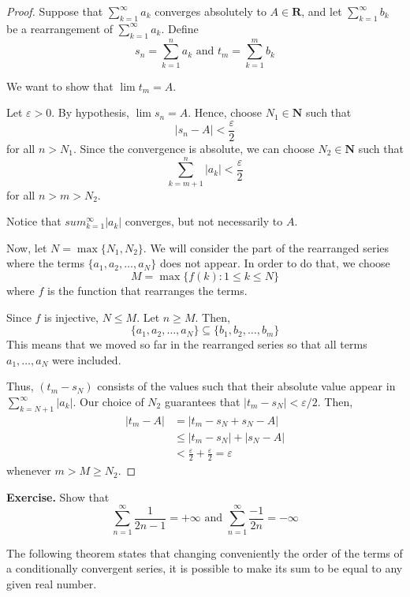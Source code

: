 \documentclass[12pt,a4paper]{article}
\theoremstyle{definition}
\begin{document}
\begin{proof}
	Suppose that $\sum_{k=1}^\infty a_k$ converges absolutely to $A \in \textbf{R}$, and let $\sum_{k=1}^\infty b_k$ be a rearrangement of $\sum_{k=1}^\infty a_k$. Define
	\[
		s_n = \sum_{k=1}^n a_k \text{ and } t_m = \sum_{k=1}^m b_k
	\]
	
	We want to show that $\lim t_m = A$. 
	
	Let $\varepsilon > 0$. By hypothesis, $\lim s_n = A$. Hence, choose $N_1 \in \textbf{N}$ such that
	\[
		|s_n - A| < \frac{\varepsilon}{2}
	\]
	for all $n > N_1$. Since the convergence is absolute, we can choose $N_2 \in \textbf{N}$ such that
	\[
		\sum_{k=m+1}^n |a_k| < \frac{\varepsilon}{2}
	\]
	for all $n > m > N_2$.
	
	Notice that $sum_{k=1}^\infty |a_k|$ converges, but not necessarily to $A$. 
	
	Now, let $N = \max \{ N_1, N_2 \}$. We will consider the part of the rearranged series where the terms $\{ a_1, a_2, \ldots, a_N \}$ does not appear. In order to do that, we choose
	\[
		M = \max \{ f(k) : 1 \leq k \leq N \}
	\]
	where $f$ is the function that rearranges the terms.
	
	Since $f$ is injective, $N \leq M$. Let $n \geq M$. Then,
	\[
		\{ a_1, a_2, \ldots, a_N \} \subseteq \{ b_1, b_2, \ldots, b_m \}
	\]
	This means that we moved so far in the rearranged series so that all terms $a_1, \ldots, a_N$ were included. 
	
	Thus, $(t_m - s_N)$ consists of the values such that their absolute value appear in $\sum_{k=N+1}^\infty |a_k|$. Our choice of $N_2$ guarantees that $|t_m - s_N| < \varepsilon / 2$. Then,
	\begin{equation*}
		\begin{aligned}
			|t_m - A| &= |t_m - s_N + s_N - A| \\
			&\leq |t_m - s_N| + |s_N - A| \\
			&< \frac{\varepsilon}{2} + \frac{\varepsilon}{2} = \varepsilon
		\end{aligned}
	\end{equation*}
	whenever $m > M \geq N_2$.
\end{proof}

\textbf{Exercise.} Show that
\[
	\sum_{n=1}^\infty \frac{1}{2n-1} = + \infty \text{ and } \sum_{n=1}^\infty \frac{-1}{2n} = - \infty
\]

The following theorem states that changing conveniently the order of the terms of a conditionally convergent series, it is possible to make its sum to be equal to any given real number.
\end{document}
